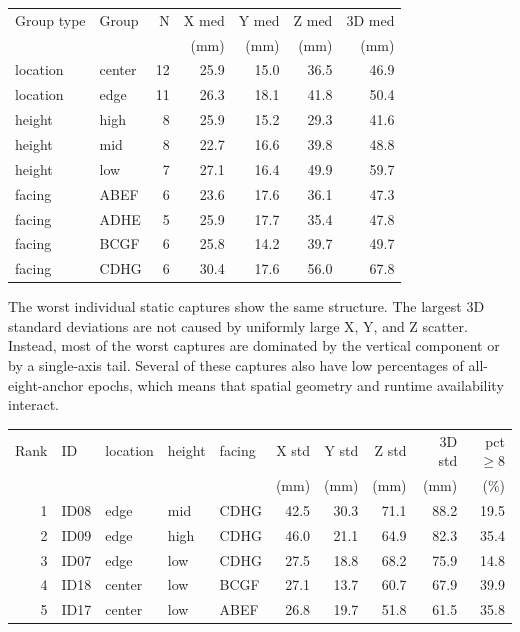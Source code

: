 \documentclass[11pt]{article}
\begin{document}
\begin{center}
\small
\setlength{\tabcolsep}{4pt}
\begin{tabular}{l l r r r r r}
\toprule
Group type & Group & N & X med & Y med & Z med & 3D med \\
 & & & (mm) & (mm) & (mm) & (mm) \\
\midrule
location & center & 12 & 25.9 & 15.0 & 36.5 & 46.9 \\
location & edge & 11 & 26.3 & 18.1 & 41.8 & 50.4 \\
height & high & 8 & 25.9 & 15.2 & 29.3 & 41.6 \\
height & mid & 8 & 22.7 & 16.6 & 39.8 & 48.8 \\
height & low & 7 & 27.1 & 16.4 & 49.9 & 59.7 \\
facing & ABEF & 6 & 23.6 & 17.6 & 36.1 & 47.3 \\
facing & ADHE & 5 & 25.9 & 17.7 & 35.4 & 47.8 \\
facing & BCGF & 6 & 25.8 & 14.2 & 39.7 & 49.7 \\
facing & CDHG & 6 & 30.4 & 17.6 & 56.0 & 67.8 \\
\bottomrule
\end{tabular}
\end{center}

The worst individual static captures show the same structure. The largest 3D standard deviations are not caused by uniformly large X, Y, and Z scatter. Instead, most of the worst captures are dominated by the vertical component or by a single-axis tail. Several of these captures also have low percentages of all-eight-anchor epochs, which means that spatial geometry and runtime availability interact.

\begin{center}
\scriptsize
\setlength{\tabcolsep}{3pt}
\begin{tabular}{r l l l l r r r r r}
\toprule
Rank & ID & location & height & facing & X std & Y std & Z std & 3D std & pct $\geq$8 \\
 & & & & & (mm) & (mm) & (mm) & (mm) & (\%) \\
\midrule
1 & ID08 & edge & mid & CDHG & 42.5 & 30.3 & 71.1 & 88.2 & 19.5 \\
2 & ID09 & edge & high & CDHG & 46.0 & 21.1 & 64.9 & 82.3 & 35.4 \\
3 & ID07 & edge & low & CDHG & 27.5 & 18.8 & 68.2 & 75.9 & 14.8 \\
4 & ID18 & center & low & BCGF & 27.1 & 13.7 & 60.7 & 67.9 & 39.9 \\
5 & ID17 & center & low & ABEF & 26.8 & 19.7 & 51.8 & 61.5 & 35.8 \\
\bottomrule
\end{tabular}
\end{center}
\end{document}
